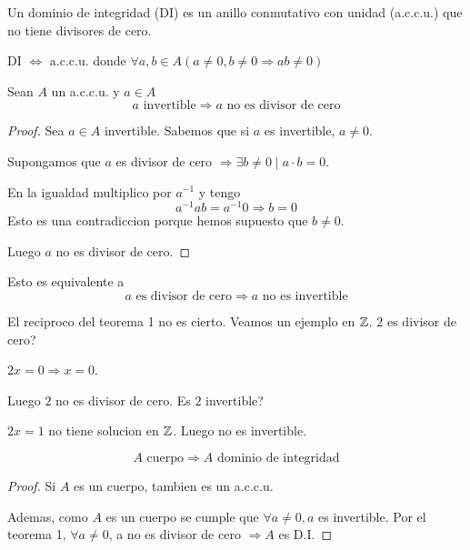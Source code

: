 \begin{definition}
	Un dominio de integridad (DI) es un anillo conmutativo con unidad (a.c.c.u.) que no tiene divisores de cero.
\end{definition}
\begin{remark}
	DI \(\iff \) a.c.c.u. donde \(\forall a,b \in A (a \neq 0, b \neq 0 \Rightarrow ab \neq 0)\)
\end{remark}
\begin{theorem}
	Sean \(A \) un a.c.c.u. y \(a \in A \)
	\[
		a \text{ invertible} \Rightarrow a \text{ no es divisor de cero}
	\]
\end{theorem}
\begin{proof}
	Sea \(a \in A \) invertible. Sabemos que si \(a \) es invertible, \(a \neq  0 \).
	
	Supongamos que \(a \) es divisor de cero \(\Rightarrow \exists b \neq 0 \mid a \cdot b = 0 \).
	
	En la igualdad multiplico por \(a^{-1}  \) y tengo
	\[
		a^{-1} a b = a^{-1} 0 \Rightarrow b = 0
	\]
	Esto es una contradiccion porque hemos supuesto que \(b \neq 0 \).
	
	Luego \(a \) no es divisor de cero.
\end{proof}
\begin{remark}
	Esto es equivalente a
	\[
		a \text{ es divisor de cero} \Rightarrow a \text{ no es invertible}
	\]
\end{remark}
\begin{remark}
	El reciproco del teorema 1 no es cierto.
	Veamos un ejemplo en \(\mathbb{Z}\). \(2 \) es divisor de cero?
	
	\(2x = 0 \Rightarrow x = 0 \).
	
	Luego \(2 \) no es divisor de cero. Es \(2 \) invertible?
	
	\(2x = 1 \) no tiene solucion en \(\mathbb{Z} \). Luego no es invertible.
\end{remark}

\begin{theorem}
	\[
		A \text{ cuerpo} \Rightarrow A \text{ dominio de integridad}
	\]
\end{theorem}
\begin{proof}
	Si \(A \) es un cuerpo, tambien es un a.c.c.u.
	
	Ademas, como \(A \) es un cuerpo se cumple que \( \forall a \neq 0, a\) es invertible. Por el teorema 1,  \(\forall a \neq 0 \), a no es divisor de cero \(\Rightarrow A \) es D.I.
\end{proof}

